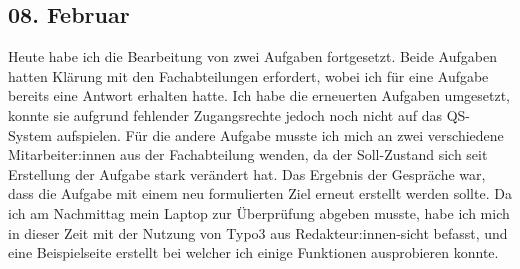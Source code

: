 \subsection{08. Februar}
Heute habe ich die Bearbeitung von zwei Aufgaben fortgesetzt. Beide Aufgaben hatten Klärung mit den Fachabteilungen erfordert, wobei ich für eine Aufgabe bereits eine Antwort erhalten hatte. Ich habe die erneuerten Aufgaben umgesetzt, konnte sie aufgrund fehlender Zugangsrechte jedoch noch nicht auf das QS-System aufspielen. Für die andere Aufgabe musste ich mich an zwei verschiedene Mitarbeiter:innen aus der Fachabteilung wenden, da der Soll-Zustand sich seit Erstellung der Aufgabe stark verändert hat. Das Ergebnis der Gespräche war, dass die Aufgabe mit einem neu formulierten Ziel erneut erstellt werden sollte. Da ich am Nachmittag mein Laptop zur Überprüfung abgeben musste, habe ich mich in dieser Zeit mit der Nutzung von Typo3 aus Redakteur:innen-sicht befasst, und eine Beispielseite erstellt bei welcher ich einige Funktionen ausprobieren konnte.